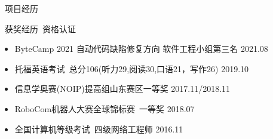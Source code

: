 \documentclass[UTF8]{resume}
\begin{document}
\begin{rSection}{\faUsers~项目经历}

\end{rSection}

\begin{rSection}{\faAward~获奖经历~资格认证}
    \begin{itemize}
        \itemsep -0.5em
        \item ByteCamp 2021 自动代码缺陷修复方向 软件工程小组第三名 \hfill 2021.08
        \item 托福英语考试~总分106(听力29,阅读30,口语21，写作26) \hfill 2019.10
        \item 信息学奥赛(NOIP)提高组山东赛区一等奖 \hfill 2017.11/2018.11
        \item RoboCom机器人大赛全球锦标赛~一等奖 \hfill 2018.07
        \item 全国计算机等级考试~四级网络工程师 \hfill 2016.11
    \end{itemize}
\end{rSection}
\end{document}
